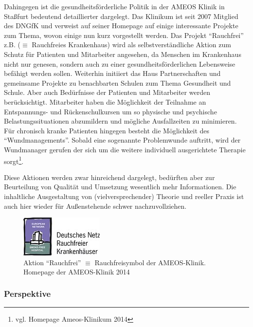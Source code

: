 Dahingegen ist die gesundheitsförderliche Politik in der AMEOS Klinik in Staßfurt bedeutend detaillierter dargelegt. Das Klinikum ist seit 2007 Mitglied des DNGfK und verweist auf seiner Homepage auf einige interessante Projekte zum Thema, wovon einige nun kurz vorgestellt werden. Das Projekt "`Rauchfrei"' z.B. ($\equiv$ Rauchfreies Krankenhaus) wird als selbstverständliche Aktion zum Schutz für Patienten und Mitarbeiter angesehen, da Menschen im Krankenhaus nicht nur genesen, sondern auch zu einer gesundheitsförderlichen Lebensweise befähigt werden sollen. Weiterhin initiiert das Haus Partnerschaften und gemeinsame Projekte zu benachbarten Schulen zum Thema Gesundheit und Schule. Aber auch Bedürfnisse der Patienten und Mitarbeiter werden berücksichtigt. Mitarbeiter haben die Möglichkeit der Teilnahme an Entspannungs- und Rückenschulkursen um so physische und psychische Belastungssituationen abzumildern und mögliche Ausfallzeiten zu minimieren. Für chronisch kranke Patienten hingegen besteht die Möglichkeit des "`Wundmanagements"'. Sobald eine sogenannte Problemwunde auftritt, wird der Wundmanager gerufen der sich um die weitere individuell ausgerichtete Therapie sorgt\footnote{vgl. Homepage Ameos-Klinikum 2014}.

Diese Aktionen werden zwar hinreichend dargelegt, bedürften aber zur Beurteilung von Qualität und Umsetzung wesentlich mehr Informationen. Die inhaltliche Ausgestaltung von (vielversprechender) Theorie und reeller Praxis ist auch hier wieder für Außenstehende schwer nachzuvollziehen.

\begin{figure}[h]
	\centering
		\includegraphics[scale=2.75]{rauchfreiymbol.jpg}
	\caption{Aktion "`Rauchfrei"' $\equiv$ Rauchfreisymbol der AMEOS-Klinik. Homepage der AMEOS-Klinik 2014}
	\label{fig:rauchfreiymbol}
\end{figure}

\subsubsection{Perspektive}
\label{sec:Perspektive}

